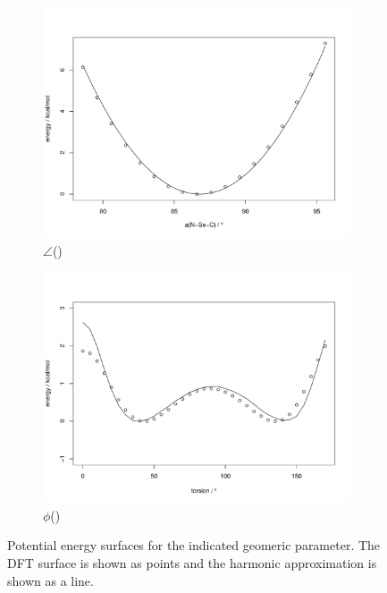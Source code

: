 \begin{refsection}
\begin{figure}
\begin{subfigure}{0.42\linewidth}
        \includegraphics[width=\linewidth]{Figures/ch2-sifig/NSeC.pdf}
        \caption{$\angle$()}
    \end{subfigure}
    \begin{subfigure}{0.42\linewidth}
        \includegraphics[width=\linewidth]{Figures/ch2-sifig/SeNCC.pdf}
        \caption{$\phi$()}
    \end{subfigure}
    \caption{Potential energy surfaces for the indicated geomeric parameter. The DFT surface is shown as points and the harmonic approximation is shown as a line.}
    \label{fig:pes}
\end{figure}


\end{refsection}
